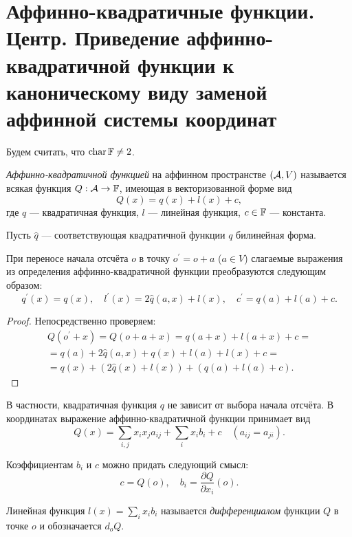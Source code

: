 \section{Аффинно-квадратичные функции. Центр. Приведение аффинно-квадратичной функции к каноническому виду заменой аффинной системы координат}

Будем считать, что $\operatorname{char}\mathbb{F} \ne 2$.

\begin{definition}
    \textit{Аффинно-квадратичной функцией} на аффинном пространстве $(\mathcal{A}, V)$ называется всякая функция $Q: \mathcal{A} \to \mathbb{F}$, имеющая в векторизованной форме вид
    \[
        Q(x) = q(x) + l(x) + c,
    \]
    где $q$ --- квадратичная функция, $l$ --- линейная функция, $c \in \mathbb{F}$ --- константа.
\end{definition}

Пусть $\widehat{q}$ --- соответствующая квадратичной функции $q$ билинейная форма.

\begin{lemma}
    При переносе начала отсчёта $o$ в точку $o^\prime = o + a$ ($a \in V$) слагаемые выражения из определения аффинно-квадратичной функции преобразуются следующим образом:
    \[
        q^\prime(x) = q(x),\quad l^\prime(x) = 2\widehat{q}(a, x) + l(x),\quad c^\prime = q(a) + l(a) + c.
    \]
\end{lemma}

\begin{proof}
    Непосредственно проверяем:
    \begin{multline*}
        Q(o^\prime + x) = Q(o + a + x) = q(a + x) + l(a + x) + c =\\ = q(a) + 2\widehat{q}(a, x) + q(x) + l(a) + l(x) + c =\\ = q(x) + (2\widehat{q}(x) + l(x)) + (q(a) + l(a) + c).
    \end{multline*}
\end{proof}

В частности, квадратичная функция $q$ не зависит от выбора начала отсчёта. В координатах выражение аффинно-квадратичной функции принимает вид
\[
    Q(x) = \sum_{i, j}x_ix_ja_{ij} + \sum_ix_ib_i + c\quad(a_{ij} = a_{ji}).
\]

Коэффициентам $b_i$ и $c$ можно придать следующий смысл:
\[
    c = Q(o),\quad b_i = \frac{\partial Q}{\partial x_i}(o).
\]

\begin{definition}
    Линейная функция $l(x) = \sum\limits_ix_ib_i$ называется \textit{дифференциалом} функции $Q$ в точке $o$ и обозначается $d_oQ$.
\end{definition}

